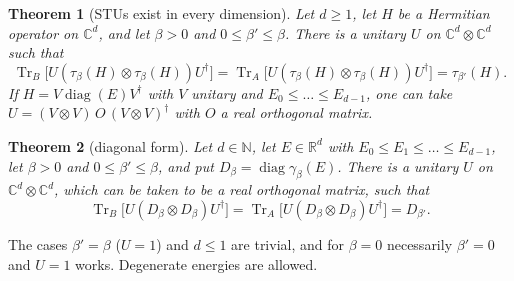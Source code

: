 \documentclass[11pt]{amsart}
\newtheorem{mainthm}{Theorem}
\theoremstyle{definition}
\theoremstyle{remark}
\numberwithin{equation}{section}
\newcommand{\R}{\mathbb{R}}
\newcommand{\C}{\mathbb{C}}
\newcommand{\N}{\mathbb{N}}
\newcommand{\Tr}{\operatorname{Tr}}
\newcommand{\diag}{\operatorname{diag}}
\begin{document}
\begin{mainthm}[STUs exist in every dimension]\label{thm:main}
Let $d\ge1$, let $H$ be a Hermitian operator on $\C^d$, and let $\beta>0$ and $0\le\beta'\le\beta$.
There is a unitary $U$ on $\C^d\otimes\C^d$ such that
\[
  \Tr_B\bigl[U(\tau_\beta(H)\otimes\tau_\beta(H))U^\dagger\bigr]
  =\Tr_A\bigl[U(\tau_\beta(H)\otimes\tau_\beta(H))U^\dagger\bigr]=\tau_{\beta'}(H) .
\]
If $H=V\diag(E)V^\dagger$ with $V$ unitary and $E_0\le\dots\le E_{d-1}$, one can take
$U=(V\otimes V)\,O\,(V\otimes V)^\dagger$ with $O$ a real orthogonal matrix.
\end{mainthm}

\begin{mainthm}[diagonal form]\label{thm:diag}
Let $d\in\N$, let $E\in\R^d$ with $E_0\le E_1\le\dots\le E_{d-1}$, let $\beta>0$ and
$0\le\beta'\le\beta$, and put $D_\beta=\diag\gamma_\beta(E)$. There is a unitary $U$ on
$\C^d\otimes\C^d$, which can be taken to be a real orthogonal matrix, such that
\[
  \Tr_B\bigl[U(D_\beta\otimes D_\beta)U^\dagger\bigr]=\Tr_A\bigl[U(D_\beta\otimes D_\beta)U^\dagger\bigr]
  =D_{\beta'} .
\]
\end{mainthm}

The cases $\beta'=\beta$ ($U=1$) and $d\le1$ are trivial, and for $\beta=0$ necessarily $\beta'=0$ and
$U=1$ works. Degenerate energies are allowed.
\end{document}
